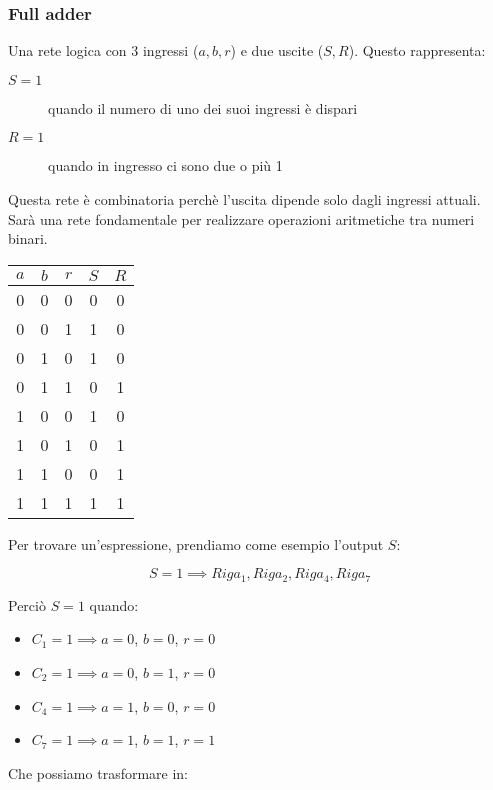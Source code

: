 \documentclass{article}
\begin{document}
\subsubsection{Full adder}

Una rete logica con 3 ingressi ($a,b,r$) e due uscite ($S,R$). Questo rappresenta:

\begin{description}
	\item[$S = 1$] quando il numero di uno dei suoi ingressi è dispari
	\item[$R = 1$] quando in ingresso ci sono due o più 1
\end{description}

\noindent
Questa rete è combinatoria perchè l'uscita dipende solo dagli ingressi attuali.
Sarà una rete fondamentale per realizzare operazioni aritmetiche tra numeri binari.

\begin{center}
\begin{tabular}{ |c|c|c|c|c| }
\hline
$a$ & $b$ & $r$ & $S$ & $R$ \\
\hline
\hline
0 & 0 & 0 & 0 & 0 \\
0 & 0 & 1 & 1 & 0 \\
0 & 1 & 0 & 1 & 0 \\
0 & 1 & 1 & 0 & 1 \\
1 & 0 & 0 & 1 & 0 \\
1 & 0 & 1 & 0 & 1 \\
1 & 1 & 0 & 0 & 1 \\
1 & 1 & 1 & 1 & 1 \\
\hline
\end{tabular}
\end{center}

\noindent
Per trovare un'espressione, prendiamo come esempio l'output $S$:

$$
S = 1 \implies Riga_1, Riga_2, Riga_4, Riga_7
$$

\noindent
Perciò $S = 1$ quando:

\begin{itemize}
    \item $C_1 = 1 \implies a = 0$, $b = 0$, $r = 0$
    \item $C_2 = 1 \implies a = 0$, $b = 1$, $r = 0$
    \item $C_4 = 1 \implies a = 1$, $b = 0$, $r = 0$
    \item $C_7 = 1 \implies a = 1$, $b = 1$, $r = 1$
\end{itemize}

\noindent
Che possiamo trasformare in:
\end{document}
